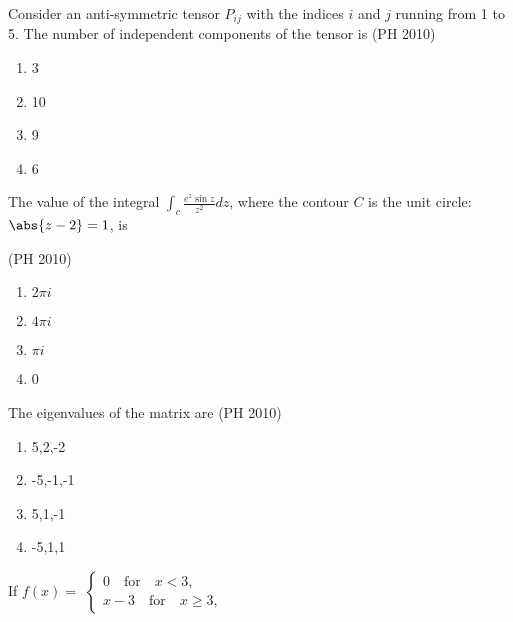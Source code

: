 \iffalse
\title{PH-2010-1-13}
\author{EE24BTECH11041-Mohit}
\section{ph}
\chapter{2010}
\fi

\item Consider an anti-symmetric tensor $P_{ij}$ with the indices $i$ and $j$ running from 1 to 5. The number of independent components of the tensor is 
\hfill{(PH 2010)}
\begin{multicols}{4}
\begin{enumerate}
\item 3
\item 10
\item 9 
\item 6
\end{enumerate}
\end{multicols}
\item The value of the integral $\int_{c} \frac {e^z \sin{z}}{z^2}dz$, where the contour $C$ is the unit circle:
$\abs{z-2}=1$, is

\hfill{(PH 2010)}
\begin{multicols}{4}
\begin{enumerate}
\item $2\pi i$
\item $4\pi i$
\item $\pi i$
\item 0
\end{enumerate}
\end{multicols}

\item The eigenvalues of the matrix 
are 
\hfill{(PH 2010)}
\begin{multicols}{4}
\begin{enumerate}
\item 5,2,-2
\item -5,-1,-1
\item 5,1,-1
\item -5,1,1
\end{enumerate}
\end{multicols}
\item If 
$f(x) =$ 
$\begin{cases} 
0 \quad \text{for} \quad x < 3, \\ 
x - 3 \quad \text{for} \quad x \geq 3, 
\end{cases}$

